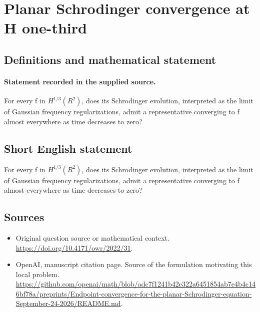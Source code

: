 \documentclass[11pt]{article}
\begin{document}
\section*{Planar Schrodinger convergence at H one-third}\label{statement}
\subsection{Definitions and mathematical statement}
\paragraph{Statement recorded in the supplied source.}
For every f in $H^{1/3}(R^2)$, does its Schrodinger evolution, interpreted as the limit of Gaussian frequency regularizations, admit a representative converging to f almost everywhere as time decreases to zero?
\subsection{Short English statement}
For every f in $H^{1/3}(R^2)$, does its Schrodinger evolution, interpreted as the limit of Gaussian frequency regularizations, admit a representative converging to f almost everywhere as time decreases to zero?
\subsection{Sources}
\begin{itemize}
\item[S1] Original question source or mathematical context.
\url{https://doi.org/10.4171/owr/2022/31}.
\item[S2] OpenAI, manuscript citation page. Source of the formulation motivating this local problem.
\url{https://github.com/openai/math/blob/adc7f1241b42e322a6451854ab7e4b4c146bf78a/preprints/Endpoint-convergence-for-the-planar-Schrodinger-equation-September-24-2026/README.md}.
\end{itemize}
\end{document}
